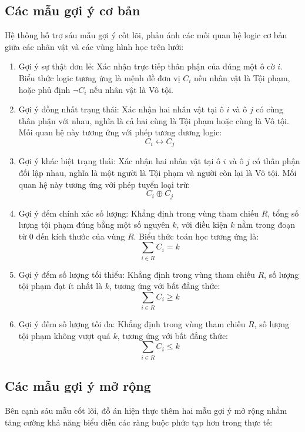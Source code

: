 \subsection{Các mẫu gợi ý cơ bản}
\label{subsec:goi-y-co-ban}

Hệ thống hỗ trợ sáu mẫu gợi ý cốt lõi, phản ánh các mối quan hệ logic cơ bản giữa các nhân vật và các vùng hình học trên lưới:

\begin{enumerate}
    \item Gợi ý sự thật đơn lẻ: Xác nhận trực tiếp thân phận của đúng một ô cờ $i$. Biểu thức logic tương ứng là mệnh đề đơn vị $C_i$ nếu nhân vật là Tội phạm, hoặc phủ định $\neg C_i$ nếu nhân vật là Vô tội.
    \item Gợi ý đồng nhất trạng thái: Xác nhận hai nhân vật tại ô $i$ và ô $j$ có cùng thân phận với nhau, nghĩa là cả hai cùng là Tội phạm hoặc cùng là Vô tội. Mối quan hệ này tương ứng với phép tương đương logic:
    \[
    C_i \leftrightarrow C_j
    \]
    \item Gợi ý khác biệt trạng thái: Xác nhận hai nhân vật tại ô $i$ và ô $j$ có thân phận đối lập nhau, nghĩa là một người là Tội phạm và người còn lại là Vô tội. Mối quan hệ này tương ứng với phép tuyển loại trừ:
    \[
    C_i \oplus C_j
    \]
    \item Gợi ý đếm chính xác số lượng: Khẳng định trong vùng tham chiếu $R$, tổng số lượng tội phạm đúng bằng một số nguyên $k$, với điều kiện $k$ nằm trong đoạn từ 0 đến kích thước của vùng $R$. Biểu thức toán học tương ứng là:
    \[
    \sum_{i \in R} C_i = k
    \]
    \item Gợi ý đếm số lượng tối thiểu: Khẳng định trong vùng tham chiếu $R$, số lượng tội phạm đạt ít nhất là $k$, tương ứng với bất đẳng thức:
    \[
    \sum_{i \in R} C_i \ge k
    \]
    \item Gợi ý đếm số lượng tối đa: Khẳng định trong vùng tham chiếu $R$, số lượng tội phạm không vượt quá $k$, tương ứng với bất đẳng thức:
    \[
    \sum_{i \in R} C_i \le k
    \]
\end{enumerate}

\subsection{Các mẫu gợi ý mở rộng}
\label{subsec:goi-y-mo-rong}

Bên cạnh sáu mẫu cốt lõi, đồ án hiện thực thêm hai mẫu gợi ý mở rộng nhằm tăng cường khả năng biểu diễn các ràng buộc phức tạp hơn trong thực tế:

